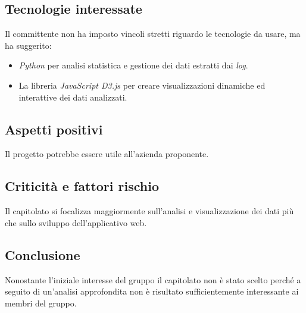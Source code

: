\subsection{Tecnologie interessate}
Il committente non ha imposto vincoli stretti riguardo le tecnologie da usare, ma ha suggerito:
\begin{itemize}
    \item \textit{Python} per analisi statistica e gestione dei dati estratti dai \textit{log}.
    \item La libreria \textit{JavaScript D3.js} per creare visualizzazioni dinamiche ed interattive dei dati analizzati.
\end{itemize}

\subsection{Aspetti positivi}
Il progetto potrebbe essere utile all’azienda proponente.

\subsection{Criticità e fattori rischio}
Il capitolato si focalizza maggiormente sull'analisi e visualizzazione dei dati più che sullo sviluppo dell’applicativo web.

\subsection{Conclusione}
Nonostante l’iniziale interesse del gruppo il capitolato non è stato scelto perché a seguito di un'analisi
approfondita non è risultato sufficientemente interessante ai membri del gruppo.

